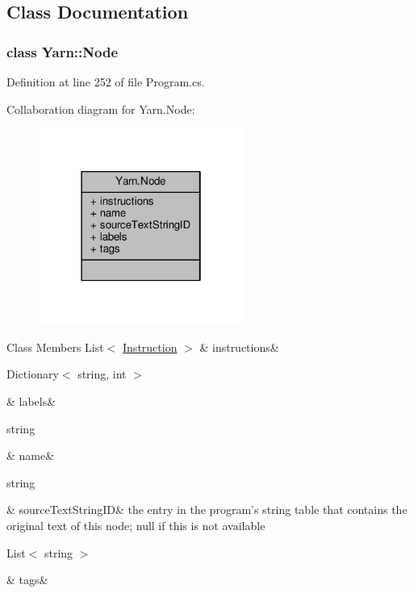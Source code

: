 \subsection{Class Documentation}
\label{a00379}
\hypertarget{a00051_a00379}{}
\subsubsection{class Yarn\-:\-:Node}


Definition at line 252 of file Program.\-cs.



Collaboration diagram for Yarn.\-Node\-:
\nopagebreak
\begin{figure}[H]
\begin{center}
\leavevmode
\includegraphics[width=190pt]{a00393}
\end{center}
\end{figure}
\begin{DoxyFields}{Class Members}
\hypertarget{a00051_a156723a9252b62d288ddf611939ea7c3}{List$<$ \hyperlink{a00119}{Instruction} $>$}\label{a00051_a156723a9252b62d288ddf611939ea7c3}
&
instructions&
\\
\hline

\hypertarget{a00051_a9afa49f4fbc72e806a0210cb4198f12e}{Dictionary$<$ string, int $>$}\label{a00051_a9afa49f4fbc72e806a0210cb4198f12e}
&
labels&
\\
\hline

\hypertarget{a00051_a107b0de3fcfc65e99913edc01b5ce9db}{string}\label{a00051_a107b0de3fcfc65e99913edc01b5ce9db}
&
name&
\\
\hline

\hypertarget{a00051_a09c6af5b50925d0876283b84281b3ed4}{string}\label{a00051_a09c6af5b50925d0876283b84281b3ed4}
&
source\-Text\-String\-I\-D&
the entry in the program's string table that contains the original text of this node; null if this is not available \\
\hline

\hypertarget{a00051_a811086feceebbe79a74eba071c1d516b}{List$<$ string $>$}\label{a00051_a811086feceebbe79a74eba071c1d516b}
&
tags&
\\
\hline

\end{DoxyFields}
